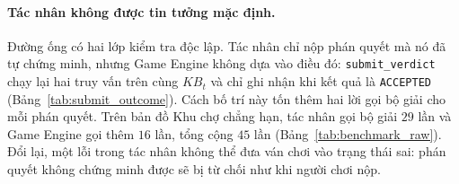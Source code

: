 \begin{sloppypar}
\paragraph{Tác nhân không được tin tưởng mặc định.}
Đường ống có hai lớp kiểm tra độc lập. Tác nhân chỉ nộp phán quyết mà nó đã tự
chứng minh, nhưng Game Engine không dựa vào điều đó: \texttt{submit\_verdict}
chạy lại hai truy vấn trên cùng $\mathit{KB}_t$ và chỉ ghi nhận khi kết quả là
\texttt{ACCEPTED} (Bảng~\ref{tab:submit_outcome}). Cách bố trí này tốn thêm hai
lời gọi bộ giải cho mỗi phán quyết. Trên bản đồ Khu chợ chẳng hạn, tác nhân gọi
bộ giải $29$ lần và Game Engine gọi thêm $16$ lần, tổng cộng $45$ lần
(Bảng~\ref{tab:benchmark_raw}). Đổi lại, một lỗi trong tác nhân không thể đưa
ván chơi vào trạng thái sai: phán quyết không chứng minh được sẽ bị từ chối như
khi người chơi nộp.
\end{sloppypar}
